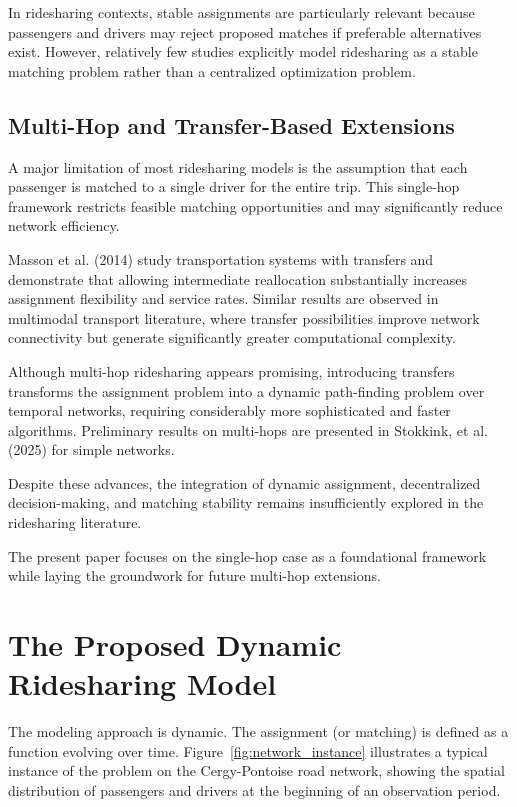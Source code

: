 \documentclass[11pt,a4paper]{article}
\begin{document}
In ridesharing contexts, stable assignments are particularly relevant because passengers and drivers may reject proposed matches if preferable alternatives exist. However, relatively few studies explicitly model ridesharing as a stable matching problem rather than a centralized optimization problem.


\subsection{Multi-Hop and Transfer-Based Extensions}
A major limitation of most ridesharing models is the assumption that each passenger is matched to a single driver for the entire trip. This single-hop framework restricts feasible matching opportunities and may significantly reduce network efficiency.

Masson et al. (2014) study transportation systems with transfers and demonstrate that allowing intermediate reallocation substantially increases assignment flexibility and service rates. Similar results are observed in multimodal transport literature, where transfer possibilities improve network connectivity but generate significantly greater computational complexity.

Although multi-hop ridesharing appears promising, introducing transfers transforms the assignment problem into a dynamic path-finding problem over temporal networks, requiring considerably more sophisticated and faster algorithms. Preliminary results on multi-hops are presented in Stokkink, et al. (2025) for simple networks.

Despite these advances, the integration of dynamic assignment, decentralized decision-making, and matching stability remains insufficiently explored in the ridesharing literature.

The present paper focuses on the single-hop case as a foundational framework while laying the groundwork for future multi-hop extensions.

\section{The Proposed Dynamic Ridesharing Model}
The modeling approach is dynamic. The assignment (or matching) is defined as a function evolving over time. Figure~\ref{fig:network_instance} illustrates a typical instance of the problem on the Cergy-Pontoise road network, showing the spatial distribution of passengers and drivers at the beginning of an observation period.
\end{document}
